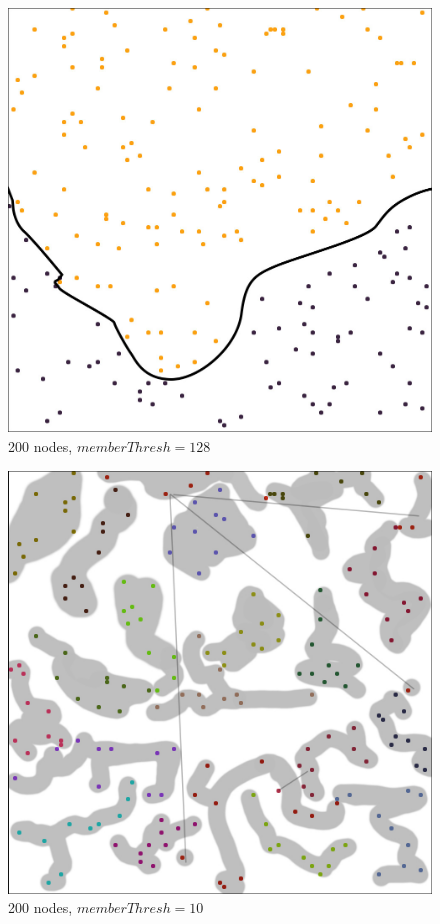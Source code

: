 \documentclass[a4paper,UKenglish]{report}
\begin{document}
\begin{figure}
	\center
	\includegraphics[scale=0.45]{Images/grouptest_1.jpg}
	\caption{200 nodes, $memberThresh=128$}
	\label{fig:200_128}
\end{figure}

\begin{figure}
	\center
	\includegraphics[scale=0.45]{Images/grouptest_2.jpg}
	\caption{200 nodes, $memberThresh=10$}
	\label{fig:200_10}
\end{figure}
\end{document}
